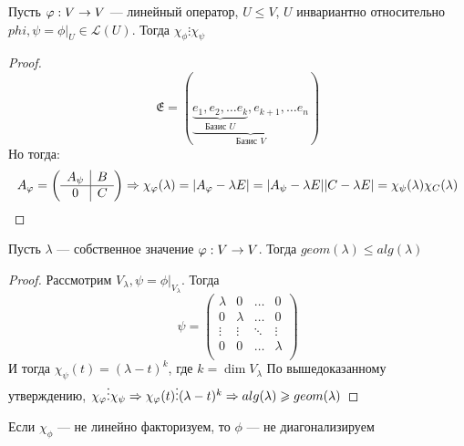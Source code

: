 \begin{proposition}
    Пусть \(\varphi: V \rightarrow V\) --- линейный оператор, \(U \le V\), \(U\) инвариантно относительно \(phi, \psi = \phi|_U \in \mathcal{L}(U)\). Тогда \(\chi_\phi \vdots \chi_\psi\)
\end{proposition}
\begin{proof}
    \[\mathfrak{E} = (\underbrace{\underbrace{e_1, e_2, \dots e_k}_{\text{Базис } U}, e_{k + 1}, \dots e_n}_{\text{Базис }V})\]
    Но тогда:
    \[A_{\varphi} = \left(\begin{array}{c|c}
        A_\psi & B \\ 
        \hline
        0 & C \\
    \end{array}\right) \Rightarrow \chi_{\varphi}(\lambda) = |A_{\varphi} - \lambda E| = |A_\psi - \lambda E||C - \lambda E| = \chi_\psi(\lambda)\chi_C(\lambda)\]
\end{proof}

\begin{corollary}
    Пусть \(\lambda\) --- собственное значение \(\varphi: V \rightarrow V\). Тогда \(geom(\lambda) \le alg(\lambda)\)
\end{corollary}
\begin{proof}
    Рассмотрим \(V_\lambda, \psi = \phi|_{V_\lambda}\). Тогда
    \[\psi = \left(\begin{array}{cccc}
        \lambda & 0 & \dots & 0\\
        0 & \lambda & \dots & 0\\ 
        \vdots & \vdots & \ddots & \vdots\\
        0 & 0 & \dots & \lambda \\
    \end{array}\right)\]
    И тогда \(\chi_\psi(t) = (\lambda - t)^k\), где \(k = \dim V_{\lambda}\)
    По вышедоказанному утверждению, \(\chi_{\varphi} \vdots \chi_\psi \Rightarrow \chi_{\varphi}(t) \vdots (\lambda - t)^k \Rightarrow alg(\lambda) \geqslant geom(\lambda)\)
\end{proof}

\begin{corollary}
    Если \(\chi_\phi\) --- не линейно факторизуем, то \(\phi\) --- не диагонализируем
\end{corollary}

